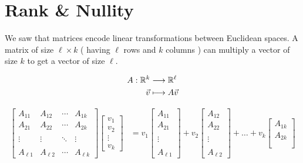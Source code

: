 \section{Rank \& Nullity}
  We saw that matrices encode linear transformations between Euclidean spaces.
  A matrix of size $\ell \times k$ ( having $\ell$ rows and $k$ columns ) can multiply a vector of size $k$ to get a vector of size $\ell$.

  \begin{align*}
    A : \mathbb{R}^k &\longrightarrow \mathbb{R}^\ell \\
    \vec{v} &\longmapsto A \vec{v}
  \end{align*}

  \begin{align}
    \label{equation:matrixMult}
    \begin{bmatrix}
      A_{11} & A_{12} & \cdots & A_{1k} \\
      A_{21} & A_{22} & \cdots & A_{2k} \\\\
      \vdots & \vdots & \ddots & \vdots \\\\
      A_{\ell 1} & A_{\ell 2} & \cdots & A_{\ell k}
    \end{bmatrix}
    \begin{bmatrix} v_1 \\ v_2 \\ \vdots \\ v_k \end{bmatrix}
      &=
      v_1 \begin{bmatrix}
        A_{11} \\
        A_{21} \\\\
        \vdots \\\\
        A_{\ell 1}
      \end{bmatrix}
      + v_2 \begin{bmatrix}
        A_{12} \\
        A_{22} \\\\
        \vdots \\\\
        A_{\ell 2}
      \end{bmatrix}
      + \dots +
      v_k \begin{bmatrix}
        A_{1k} \\
        A_{2k} \\\\

\end{bmatrix}
\end{align}
